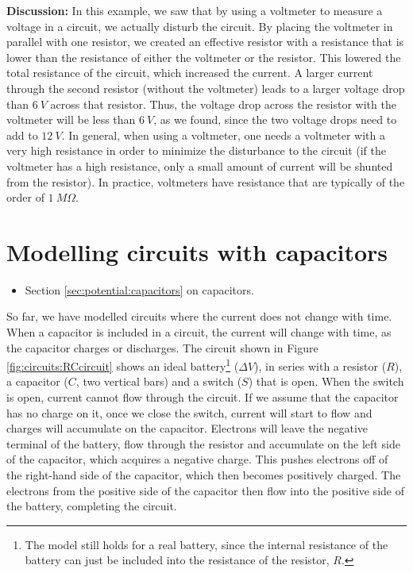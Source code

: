 \begin{example}
\textbf{Discussion: }In this example, we saw that by using a voltmeter to measure a voltage in a circuit, we actually disturb the circuit. By placing the voltmeter in parallel with one resistor, we created an effective resistor with a resistance that is lower than the resistance of either the voltmeter or the resistor. This lowered the total resistance of the circuit, which increased the current. A larger current through the second resistor (without the voltmeter) leads to a larger voltage drop than $\SI{6}{V}$ across that resistor. Thus, the voltage drop across the resistor with the voltmeter will be less than $\SI{6}{V}$, as we found, since the two voltage drops need to add to $\SI{12}{V}$. In general, when using a voltmeter, one needs a voltmeter with a very high resistance in order to minimize the disturbance to the circuit (if the voltmeter has a high resistance, only a small amount of current will be shunted from the resistor). In practice, voltmeters have resistance that are typically of the order of $\SI{1}{M\Omega}$.
\end{example}

\section{Modelling circuits with capacitors}
\begin{review}
	\begin{itemize}
		\item Section \ref{sec:potential:capacitors} on capacitors.
	\end{itemize}
\end{review}
So far, we have modelled circuits where the current does not change with time. When a capacitor is included in a circuit, the current will change with time, as the capacitor charges or discharges. The circuit shown in Figure \ref{fig:circuits:RCcircuit} shows an ideal battery\footnote{The model still holds for a real battery, since the internal resistance of the battery can just be included into the resistance of the resistor, $R$.} ($\Delta V$), in series with a resistor ($R$), a capacitor ($C$, two vertical bars) and a switch ($S$) that is open. 
When the switch is open, current cannot flow through the circuit. If we assume that the capacitor has no charge on it, once we close the switch, current will start to flow and charges will accumulate on the capacitor. Electrons will leave the negative terminal of the battery, flow through the resistor and accumulate on the left side of the capacitor, which acquires a negative charge. This pushes electrons off of the right-hand side of the capacitor, which then becomes positively charged. The electrons from the positive side of the capacitor then flow into the positive side of the battery, completing the circuit.

